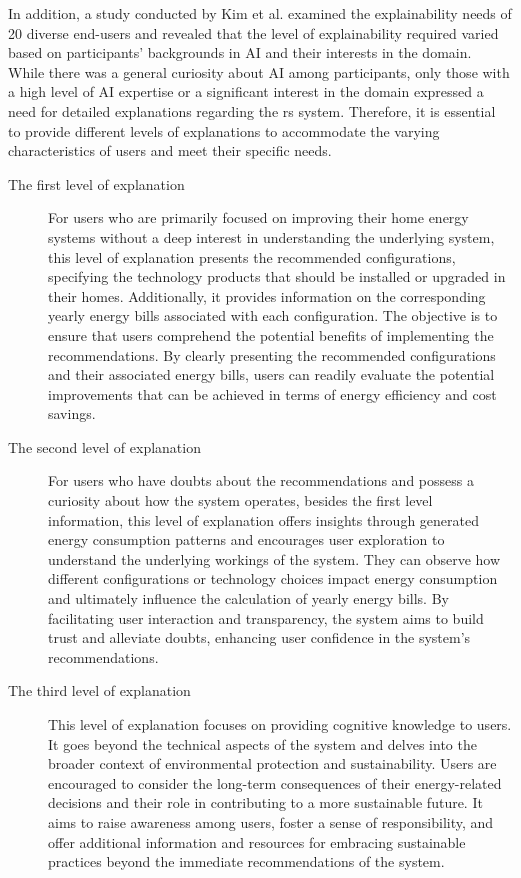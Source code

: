 In addition, a study conducted by Kim et al. \cite{Kim2023} examined the explainability needs of 20 diverse end-users 
and revealed that the level of explainability required varied based on participants' backgrounds in AI and their interests in the domain. 
While there was a general curiosity about AI among participants, only those with a high level of AI expertise or a significant interest in the domain expressed a need for detailed explanations regarding the \gls{rs} system. 
Therefore, it is essential to provide different levels of explanations to accommodate the varying characteristics of users and meet their specific needs. 
\begin{description}
  \item[The first level of explanation] For users who are primarily focused on improving their home energy systems without a deep interest in understanding the underlying system, 
    this level of explanation presents the recommended configurations, specifying the technology products that should be installed or upgraded in their homes. 
    Additionally, it provides information on the corresponding yearly energy bills associated with each configuration. 
    The objective is to ensure that users comprehend the potential benefits of implementing the recommendations. By clearly presenting the recommended configurations and their associated energy bills, users can readily evaluate the potential improvements that can be achieved in terms of energy efficiency and cost savings. 
  \item[The second level of explanation] For users who have doubts about the recommendations and possess a curiosity about how the system operates, 
    besides the first level information, this level of explanation offers insights through generated energy consumption patterns and encourages user exploration to understand the underlying workings of the system. 
    They can observe how different configurations or technology choices impact energy consumption and ultimately influence the calculation of yearly energy bills. 
    By facilitating user interaction and transparency, the system aims to build trust and alleviate doubts, enhancing user confidence in the system's recommendations.
  \item[The third level of explanation] This level of explanation focuses on providing cognitive knowledge to users. 
    It goes beyond the technical aspects of the system and delves into the broader context of environmental protection and sustainability. 
    Users are encouraged to consider the long-term consequences of their energy-related decisions and their role in contributing to a more sustainable future. 
    It aims to raise awareness among users, foster a sense of responsibility, and offer additional information and resources for embracing sustainable practices beyond the immediate recommendations of the system.
\end{description}


